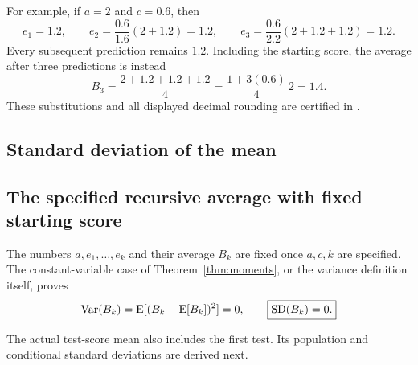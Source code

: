 For example, if \(a=2\) and \(c=0.6\), then
\[
  e_1=1.2,\qquad
  e_2=\frac{0.6}{1.6}(2+1.2)=1.2,\qquad
  e_3=\frac{0.6}{2.2}(2+1.2+1.2)=1.2.
\]
Every subsequent prediction remains \(1.2\). Including the starting score,
the average after three predictions is instead
\[
  B_3=\frac{2+1.2+1.2+1.2}{4}
      =\frac{1+3(0.6)}4\,2=1.4.
\]
These substitutions and all displayed decimal rounding are certified in
.

\begin{samepage}
\chapter{Standard deviation of the mean}

\section{The specified recursive average with fixed starting score}
The numbers \(a,e_1,\ldots,e_k\) and their average \(B_k\) are fixed once
\(a,c,k\) are specified. The constant-variable case of
Theorem~\ref{thm:moments}, or the variance definition itself, proves
\begin{equation}
  \operatorname{Var}(B_k)=\operatorname{E}[(B_k-\operatorname{E}[B_k])^2]=0,
  \qquad \boxed{\operatorname{SD}(B_k)=0.}
  \label{eq:fixed-sd}
\end{equation}
\end{samepage}
The actual test-score mean also includes the first test. Its population and
conditional standard deviations are derived next.

